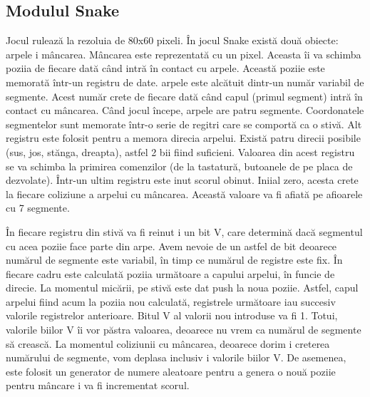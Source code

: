 \documentclass[a4paper,11pt,romanian]{article}
\begin{document}
{\subsection{Modulul Snake} \label{sneic}

Jocul ruleaz\u{a} la rezoluia de 80x60 pixeli. \^{I}n jocul Snake exist\u{a} dou\u{a} obiecte: arpele i m\^{a}ncarea.
M\^{a}ncarea este reprezentat\u{a} cu un pixel. Aceasta \^{i}i va schimba poziia de fiecare dat\u{a} c\^{a}nd intr\u{a} \^{i}n contact cu arpele.
Aceast\u{a} poziie este memorat\u{a} \^{i}ntr-un registru de date.
arpele este alc\u{a}tuit dintr-un num\u{a}r variabil de segmente. Acest num\u{a}r crete de fiecare dat\u{a} c\^{a}nd capul (primul segment) intr\u{a} \^{i}n contact cu m\^{a}ncarea.
C\^{a}nd jocul \^{i}ncepe, arpele are patru segmente. Coordonatele segmentelor sunt memorate \^{i}ntr-o serie de regitri care se comport\u{a} ca o stiv\u{a}.
Alt registru este folosit pentru a memora direcia arpelui. Exist\u{a} patru direcii posibile (sus, jos, st\u{a}nga, dreapta), astfel 2 bii fiind suficieni.
Valoarea din acest registru se va schimba la primirea comenzilor (de la tastatur\u{a}, butoanele de pe placa de dezvolate).
\^{I}ntr-un ultim registru este inut scorul obinut. Iniial zero, acesta crete la fiecare coliziune a arpelui cu m\^{a}ncarea. Aceast\u{a} valoare va fi afiat\u{a} pe afioarele cu 7 segmente.

\^{I}n fiecare registru din stiv\u{a} va fi reinut i un bit V, care determin\u{a} dac\u{a} segmentul cu acea poziie face parte din arpe. Avem nevoie de un astfel de bit deoarece num\u{a}rul de segmente este variabil, \^{i}n timp ce num\u{a}rul de registre este fix. \^{I}n fiecare cadru este calculat\u{a} poziia urm\u{a}toare a capului arpelui, \^{i}n funcie de direcie.
La momentul mic\u{a}rii, pe stiv\u{a} este dat push la noua poziie. Astfel, capul arpelui fiind acum la poziia nou calculat\u{a}, registrele urm\u{a}toare iau succesiv valorile registrelor anterioare. Bitul V al valorii nou introduse va fi 1.
Totui, valorile biilor V \^{i}i vor p\u{a}stra valoarea, deoarece nu vrem ca num\u{a}rul de segmente s\u{a} creasc\u{a}.
La momentul coliziunii cu m\^{a}ncarea, deoarece dorim i creterea num\u{a}rului de segmente, vom deplasa inclusiv i valorile biilor V.
De asemenea, este folosit un generator de numere aleatoare pentru a genera o nou\u{a} poziie pentru m\^{a}ncare i va fi incrementat scorul.

}
\end{document}

